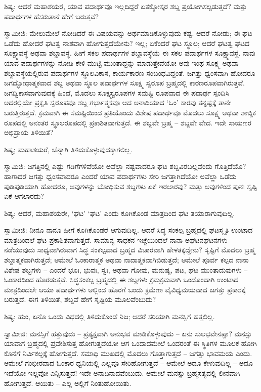 ಶಿಷ್ಯ: ಆದರೆ ಮಹಾಶಯರೆ, ಯಾವ ಪದಾರ್ಥವೂ ಇಲ್ಲದಿದ್ದರೆ ಏತಕ್ಕೋಸ್ಕರ ಶಬ್ದ ಪ್ರಯೋಗಿಸಲ್ಪಡುತ್ತದೆ? ಮತ್ತು ಪದಾರ್ಥಗಳ ಹೆಸರುತಾನೆ ಹೇಗೆ ಬರುತ್ತವೆ?

ಸ್ವಾಮೀಜಿ: ಮೇಲುಮೇಲೆ ನೋಡಿದರೆ ಈ ವಿಷಯವನ್ನು ಅರ್ಥಮಾಡಿಕೊಳ್ಳುವುದು ಕಷ್ಟ. ಆದರೆ ನೋಡು; ಈ ಘಟ ಒಡೆದು ಹೋದರೆ ಘಟತ್ವ ನಾಶವಾಗಿ ಹೋಗುತ್ತದೆಯೇನು? ಇಲ್ಲ; ಏಕೆಂದರೆ ಘಟ ಸ್ಥೂಲ; ಆದರೆ ಘಟತ್ವ ಘಟದ ಸೂಕ್ಷ್ಮಾವಸ್ಥೆ ಅಥವಾ ಶಬ್ದಾವಸ್ಥೆ. ಹೀಗೆ ಸಕಲ ಪದಾರ್ಥಗಳ ಶಬ್ದಾವಸ್ಥೆಯೆ ಈ ಸಕಲ ಪದಾರ್ಥಗಳ ಸೂಕ್ಷ್ಮಾವಸ್ಥೆ. ನಾವು ಯಾವ ಪದಾರ್ಥಗಳನ್ನು ನೋಡಿ ಕೇಳಿ ಮುಟ್ಟಿ ಮುಂತಾದ್ದನ್ನು ಮಾಡುತ್ತೇವೆಯೋ ಅವು ಇಂಥ ಸೂಕ್ಷ್ಮ ಅಥವಾ ಶಬ್ದಾವಸ್ಥೆಯಲ್ಲಿರುವ ಪದಾರ್ಥಗಳ ಸ್ಥೂಲವಿಕಾಸ, ಕಾರ್ಯಕಾರಣ ಸಂಬಂಧವಿದ್ದಂತೆ. ಜಗತ್ತು ಧ್ವಂಸವಾಗಿ ಹೋದರೂ ಜಗದ್ಭೋಧಾತ್ಮಕವಾದ ಶಬ್ದ ಅಥವಾ ಸ್ಥೂಲ ಪದಾರ್ಥಗಳ ಸೂಕ್ಷ್ಮ ಸ್ವರೂಪ ಬ್ರಹ್ಮದಲ್ಲಿ ಕಾರಣರೂಪವಾಗಿರುತ್ತವೆ. ಜಗದ್ವಿಕಾಸವಾಗುವುದಕ್ಕೆ ಹಿಂದೆ, ಮೊದಲು ಸೂಕ್ಷ್ಮಸ್ವರೂಪಗಳ ಸಮಷ್ಟಿ ರೂಪವಾದ ಈ ಪದಾರ್ಥ ಸ್ಪಂದಿಸಿ ಅದರಲ್ಲಿಯೇ ಪ್ರಕೃತಿ ಸ್ವರೂಪವೂ ಶಬ್ದ ಗರ್ಭಾತ್ಮಕವೂ ಆದ ಅನಾದಿಯಾದ ‘ಓಂ’ ಕಾರವು ತನ್ನಷ್ಟಕ್ಕೆ ತಾನೇ ಬರುತ್ತಿರುತ್ತದೆ. ಕ್ರಮವಾಗಿ ಈ ಸಮಷ್ಟಿಯಿಂದ ಪ್ರತಿಯೊಂದು ವಿಶೇಷ ಪದಾರ್ಥವೂ ಮೊದಲು ಸೂಕ್ಷ್ಮ ಅಥವಾ ಶಾಬ್ದಿಕ ರೂಪದಲ್ಲಿ ಅನಂತರ ಸ್ಥೂಲರೂಪದಲ್ಲಿ ಪ್ರಕಾಶಿತವಾಗುತ್ತದೆ. ಈ ಶಬ್ದವೇ ಬ್ರಹ್ಮ – ಶಬ್ದವೇ ವೇದ. ಇದೇ ಸಾಯಣರ ಅಭಿಪ್ರಾಯ ತಿಳಿಯಿತೆ?

ಶಿಷ್ಯ; ಮಹಾಶಯರೆ, ಚೆನ್ನಾಗಿ ತಿಳಿದುಕೊಳ್ಳುವುದಕ್ಕಾಗಲಿಲ್ಲ.

ಸ್ವಾಮಿಜಿ: ಜಗತ್ತಿನಲ್ಲಿ ಎಷ್ಟು ಗಡಿಗೆಗಳಿವೆಯೋ ಅವೆಲ್ಲಾ ನಷ್ಟವಾದರೂ ಘಟ ಶಬ್ದವಿರಬಲ್ಲವೆಂದು ಗೊತ್ತಿದೆಯೊ? ಹಾಗಾದರೆ ಜಗತ್ತು ಧ್ವಂಸವಾದರೂ ಎಂದರೆ ಯಾವ ಪದಾರ್ಥಗಳು ಸೇರಿ ಜಗತ್ತಾಗಿದೆಯೋ ಅವೆಲ್ಲಾ ಒಡೆದು ಪುಡಿಪುಡಿಯಾಗಿ ಹೋದರೂ, ಅವುಗಳನ್ನು ಬೋಧಿಸುವ ಶಬ್ದಗಳು ಏಕೆ ಇರಲಾರವು? ಮತ್ತು ಅವುಗಳಿಂದ ಪುನಃ ಸೃಷ್ಟಿ ಏಕೆ ಆಗಲಾರದು?

ಶಿಷ್ಯ: ಆದರೆ, ಮಹಾಶಯರೇ, ‘ಘಟ’ ‘ಘಟ’ ಎಂದು ಕೂಗಿಕೊಂಡ ಮಾತ್ರದಿಂದ ಘಟ ತಯಾರಾಗುವುದಿಲ್ಲ.

ಸ್ವಾಮೀಜಿ: ನೀನೂ ನಾನೂ ಹೀಗೆ ಕೂಗಿಕೊಂಡರೆ ಆಗುವುದಿಲ್ಲ. ಆದರೆ ಸಿದ್ಧ ಸಂಕಲ್ಪ ಬ್ರಹ್ಮದಲ್ಲಿ ಘಟಸ್ಮೃತಿ ಉಂಟಾದ ಮಾತ್ರದಿಂದಲೆ ಘಟ ಪ್ರಕಾಶಿತವಾಗುತ್ತದೆ. ಸಾಮಾನ್ಯ ಸಾಧಕನ ಇಚ್ಚೆಯಿಂದಲೆ ನಾನಾ ಅಘಟನಘಟನಗಳು ನಡೆಯುವುದು ಸಾಧ್ಯವಾಗಿರುವಾಗ ಸಿದ್ಧ ಸಂಕಲ್ಪವಾದ ಬ್ರಹ್ಮದ ವಿಚಾರವಾಗಿ ಹೇಳತಕ್ಕದ್ದೇನು? ಸೃಷ್ಟಿಗೆ ಮೊದಲು ಬ್ರಹ್ಮ ಶಬ್ದಾತ್ಮಕವಾಗಿರುತ್ತದೆ; ಆಮೇಲೆ ಓಂಕಾರಾತ್ಮಕ ಅಥವಾ ನಾದಾತ್ಮಕವಾಗಿಬಿಡುತ್ತದೆ; ಆಮೇಲೆ ಪೂರ್ವ ಕಲ್ಪದ ನಾನಾ ವಿಶೇಷ ಶಬ್ದಗಳು – ಎಂದರೆ ಭೂಃ, ಭುವಃ, ಸ್ವಃ, ಅಥವಾ ಗೋವು, ಮನುಷ್ಯ, ಪಟ, ಘಟ ಮುಂತಾದುವುಗಳು – ಓಂಕಾರದಿಂದ ಹೊರಡುತ್ತವೆ. ಸಿದ್ಧಸಂಕಲ್ಪ ಬ್ರಹ್ಮದಲ್ಲಿ ಈ ಶಬ್ದಗಳು ಕ್ರಮಕ್ರಮವಾಗಿ ಒಂದೊಂದಾಗಿ ಉಂಟಾದ ಮಾತ್ರದಿಂದಲೇ ಆಯಾ ಪದಾರ್ಥಗಳು ಅಲ್ಲಿಂದ ಹೊರಗೆ ಬಂದು ಕ್ರಮೇಣ ವೈವಿಧ್ಯಮಯವಾದ ಜಗತ್ತು ಪ್ರಕಾಶಕ್ಕೆ ಬರುತ್ತದೆ. ಈಗ ತಿಳಿಯಿತೆ, ಶಬ್ದವೆ ಹೇಗೆ ಸೃಷ್ಟಿಯ ಮೂಲವೆಂಬುದು?

ಶಿಷ್ಯ: ಹುಂ, ಏನೊ ಒಂದು ವಿಧದಲ್ಲಿ ತಿಳಿದುಕೊಂಡೆ ನಿಜ; ಆದರೆ ಸರಿಯಾಗಿ ಮನಸ್ಸಿಗೆ ಹತ್ತಲಿಲ್ಲ.

ಸ್ವಾಮೀಜಿ: ಮನಸ್ಸಿಗೆ ಹತ್ತುವುದು – ಪ್ರತ್ಯಕ್ಷವಾಗಿ ಅನುಭವ ಮಾಡಿಕೊಳ್ಳುವುದು – ಏನು ಸುಲಭವೇನಪ್ಪಾ? ಮನಸ್ಸು ಯಾವಾಗ ಬ್ರಹ್ಮದಲ್ಲಿ ಪ್ರವೇಶಿಸುತ್ತ ಹೋಗುತ್ತದೆಯೋ ಆಗ ಒಂದಾದಮೇಲೆ ಒಂದರಂತೆ ಈ ಸ್ಥಿತಿಗಳ ಮೂಲಕ ಹೋಗಿ ಕೊನೆಗೆ ನಿರ್ವಿಕಲ್ಪಕ್ಕೆ ಹೋಗುತ್ತದೆ. ಸಮಾಧಿ ಮುಖದಲ್ಲಿ ಮೊದಲು ಗೊತ್ತಾಗುತ್ತದೆ – ಜಗತ್ತು ಭಾವಮಯ ಎಂದು. ಆಮೇಲೆ ಗಂಭೀರವಾದ ಓಂಕಾರ ಧ್ವನಿಯಲ್ಲಿ ಎಲ್ಲವೂ ಸೇರಿಹೋಗುತ್ತದೆ – ಆಮೇಲೆ ಅದೂ ಕೇಳುವುದಿಲ್ಲ – ಅದೂ ಇದೆಯೋ ಇಲ್ಲವೋ ಎನ್ನಿಸುತ್ತದೆ! ಇದೇ ಅನಾದಿನಾದವೆಂಬುದು. ಆಮೇಲೆ ಮನಸ್ಸು ಬ್ರಹ್ಮಸತ್ಯದಲ್ಲಿ ಲೀನವಾಗಿ ಹೋಗುತ್ತದೆ. ಆಯಿತು – ಎಲ್ಲ ಅಲ್ಲಿಗೆ ನಿಂತುಹೋಯಿತು.

